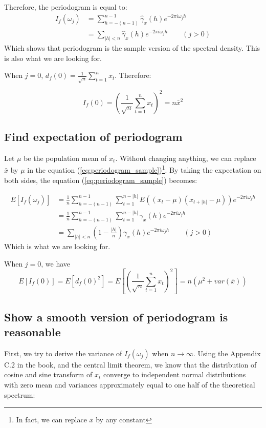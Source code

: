 Therefore, the periodogram is equal to:
\begin{equation}
\begin{split}
I_f(\omega_j) &= \sum_{h=-(n-1)}^{n-1}\hat{\gamma}_x(h) e^{-2\pi i \omega_j h} \\
&= \sum_{|h|<n}\hat{\gamma}_x(h) e^{-2\pi i \omega_j h} \qquad (j > 0)
\end{split}
\end{equation}
Which shows that periodogram is the sample version of the spectral density. This is also what we are looking for.

When $j = 0$, $d_f(0) = \frac{1}{\sqrt{n}}\sum_{t = 1}^{n} x_t$. Therefore:

\begin{equation}
I_f(0) = (\frac{1}{\sqrt{n}}\sum_{t = 1}^{n} x_t)^2 = n\bar{x}^2
\end{equation}

\subsection{Find expectation of periodogram}
Let $\mu$ be the population mean of $x_t$. Without changing anything, we can replace $\bar{x}$ by $\mu$ in the equation (\ref{eq:periodogram_sample})\footnote{In fact, we can replace $\bar{x}$ by any constant}. By taking the expectation on both sides, the equation (\ref{eq:periodogram_sample}) becomes:

\begin{equation}\label{eq:expectation_periodogram}
\begin{split}
E[I_f(\omega_j)] &= \frac{1}{n} \sum_{h=-(n-1)}^{n-1}\sum_{t=1}^{n-|h|}E((x_t - \mu)(x_{t+|h|} - \mu))e^{-2\pi i \omega_j h} \\
&= \frac{1}{n} \sum_{h=-(n-1)}^{n-1}\sum_{t=1}^{n-|h|} \gamma_x(h) e^{-2\pi i \omega_j h}\\
&= \sum_{|h|<n}(1-\frac{|h|}{n})\gamma_x(h) e^{-2\pi i \omega_j h} \qquad (j > 0)
\end{split}
\end{equation}
Which is what we are looking for.

When $j = 0$, we have 
\begin{equation} \label{eq:I_0_expectation}
E[I_f(0)] = E[d_f(0)^2] = E[(\frac{1}{\sqrt{n}}\sum_{t = 1}^{n} x_t)^2] =n(\mu^2+ var(\bar{x}))
\end{equation}

\subsection{Show a smooth version of periodogram is reasonable}
First, we try to derive the variance of $I_f(\omega_j)$ when $n \rightarrow \infty$. Using the Appendix C.2 in the book, and the central limit theorem, we know that the distribution of cosine and sine transform of $x_t$ converge to independent normal distributions with zero mean and variances approximately equal to one half of the theoretical spectrum:

